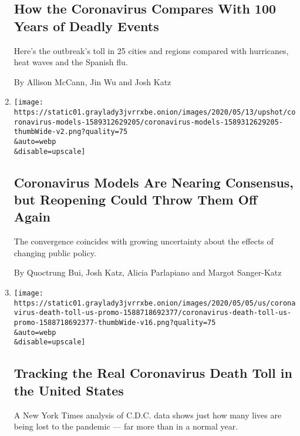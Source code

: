 \begin{enumerate}
{  \subsection{How the Coronavirus Compares With 100 Years of Deadly
  Events}\label{how-the-coronavirus-compares-with-100-years-of-deadly-events}}

  Here's the outbreak's toll in 25 cities and regions compared with
  hurricanes, heat waves and the Spanish flu.

  By Allison McCann, Jin Wu and Josh Katz
\item
  \href{/interactive/2020/05/12/upshot/coronavirus-models.html}{}

  \texttt{[image: https://static01.graylady3jvrrxbe.onion/images/2020/05/13/upshot/coronavirus-models-1589312629205/coronavirus-models-1589312629205-thumbWide-v2.png?quality=75\\\&auto=webp\\\&disable=upscale]}

  \hypertarget{coronavirus-models-are-nearing-consensus-but-reopening-could-throw-them-off-again}{%
  \subsection{Coronavirus Models Are Nearing Consensus, but Reopening
  Could Throw Them Off
  Again}\label{coronavirus-models-are-nearing-consensus-but-reopening-could-throw-them-off-again}}

  The convergence coincides with growing uncertainty about the effects
  of changing public policy.

  By Quoctrung Bui, Josh Katz, Alicia Parlapiano and Margot Sanger-Katz
\item
  \href{/interactive/2020/05/05/us/coronavirus-death-toll-us.html}{}

  \texttt{[image: https://static01.graylady3jvrrxbe.onion/images/2020/05/05/us/coronavirus-death-toll-us-promo-1588718692377/coronavirus-death-toll-us-promo-1588718692377-thumbWide-v16.png?quality=75\\\&auto=webp\\\&disable=upscale]}

  \hypertarget{tracking-the-real-coronavirus-death-toll-in-the-united-states}{%
  \subsection{Tracking the Real Coronavirus Death Toll in the United
  States}\label{tracking-the-real-coronavirus-death-toll-in-the-united-states}}

  A New York Times analysis of C.D.C. data shows just how many lives are
  being lost to the pandemic --- far more than in a normal year.


\end{enumerate}
